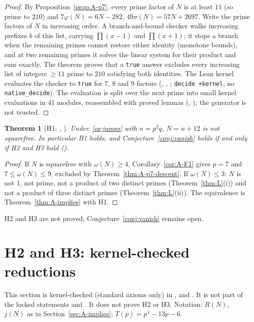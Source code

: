 \documentclass[11pt,reqno]{amsart}
\newcommand{\ph}{\varphi}
\newcommand{\sig}{\sigma}
\newtheorem{theorem}{Theorem}
\theoremstyle{definition}
\begin{document}
\begin{proof}
By Proposition~\ref{prop:A-p7}, every prime factor of \(N\) is at least \(11\) (so prime to \(210\)) and \(7\ph(N)=6N-282\), \(49\sig(N)=57N+2697\). Write the prime factors of \(N\) in increasing order. A branch-and-bound checker  walks increasing prefixes \(b\) of this list, carrying \(\prod(x-1)\) and \(\prod(x+1)\); it stops a branch when the remaining primes cannot restore either identity (monotone bounds), and at two remaining primes it solves the linear system for their product and sum exactly. The theorem  proves that a \texttt{true} answer excludes every increasing list of integers \(\ge 11\) prime to \(210\) satisfying both identities. The Lean kernel evaluates the checker to \texttt{true} for \(7\), \(8\) and \(9\) factors (, , ; \texttt{decide +kernel}, no \texttt{native\_decide}). The evaluation is split over the next prime into small kernel evaluations in 41 modules, reassembled with proved lemmas (, ); the generator  is not trusted.
\end{proof}

\begin{theorem}[H1; , ]
\label{thm:A-H1}
Under~\eqref{eq:jumps} with \(n=p^2q\), \(N=n+12\) is not squarefree. In particular H1 holds, and Conjecture~\ref{conj:vanish} holds if and only if H2 and H3 hold ().
\end{theorem}

\begin{proof}
If \(N\) is squarefree with \(\omega(N)\ge 4\), Corollary~\ref{cor:A-F1} gives \(p=7\) and \(7\le\omega(N)\le 9\), excluded by Theorem~\ref{thm:A-p7-descent}. If \(\omega(N)\le 3\): \(N\) is not \(1\), not prime, not a product of two distinct primes (Theorem~\ref{thm:L}(i)) and not a product of three distinct primes (Theorem~\ref{thm:L}(ii)). The equivalence is Theorem~\ref{thm:A-implies} with H1.
\end{proof}

H2 and H3 are not proved; Conjecture~\ref{conj:vanish} remains open.

\section{H2 and H3: kernel-checked reductions}
\label{sec:A-H2H3}

This section is kernel-checked (standard axioms only) in ,  and . It is not part of the locked statements  and . It does not prove H2 or H3. Notation: \(R(N)\), \(j(N)\) as in Section~\ref{sec:A-implies}; \(T(p)=p^4-13p-6\).
\end{document}
